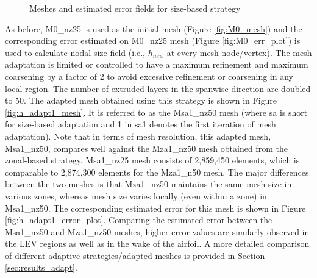 \begin{figure}[H]
\caption{Meshes and estimated error fields for size-based strategy}
\end{figure}

As before, M0\_nz25 is used as the initial mesh (Figure \ref{fig:M0_mesh}) and the corresponding error estimated on M0\_nz25 mesh (Figure \ref{fig:M0_err_plot}) is used to calculate nodal size field (i.e., $h_{new}$ at every mesh node/vertex). The mesh adaptation is limited or controlled to have a maximum refinement and maximum coarsening by a factor of 2 to avoid excessive refinement or coarsening in any local region. The number of extruded layers in the spanwise direction are doubled to 50. The adapted mesh obtained using this strategy is shown in Figure \ref{fig:h_adapt1_mesh}. It is referred to as the Msa1\_nz50 mesh (where sa is short for size-based adaptation and 1 in sa1 denotes the first iteration of mesh adaptation). Note that in terms of mesh resolution, this adapted mesh, Msa1\_nz50, compares well against the Mza1\_nz50 mesh obtained from the zonal-based strategy. Msa1\_nz25 mesh consists of 2,859,450 elements, which is comparable to 2,874,300 elements for the Mza1\_n50 mesh. The major differences between the two meshes is that Mza1\_nz50 maintains the same mesh size in various zones, whereas mesh size varies locally (even within a zone) in Msa1\_nz50.
The corresponding estimated error for this mesh is shown in Figure \ref{fig:h_adapt1_error_plot}. Comparing the estimated error between the Msa1\_nz50 and Mza1\_nz50 meshes, higher error values are similarly observed in the LEV regions as well as in the wake of the airfoil. A more detailed comparison of different adaptive strategies/adapted meshes is provided in Section \ref{sec:results_adapt}.
